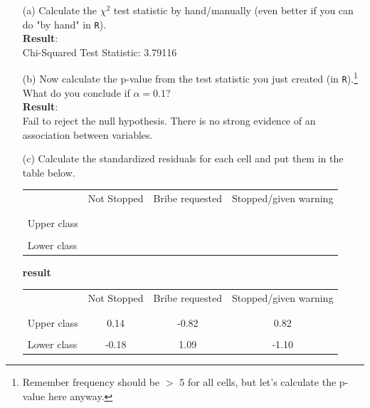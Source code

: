 \documentclass[12pt,letterpaper]{article}
\begin{document}
\begin{enumerate}
	
	\item [(a)]
	Calculate the $\chi^2$ test statistic by hand/manually (even better if you can do "by hand" in \texttt{R}).\\
			 
			 \textbf{Result}:\\
			Chi-Squared Test Statistic:  3.79116\\
			
	\vspace{7cm}
	\item [(b)]
	Now calculate the p-value from the test statistic you just created (in \texttt{R}).\footnote{Remember frequency should be $>$ 5 for all cells, but let's calculate the p-value here anyway.}  What do you conclude if $\alpha = 0.1$?\\
		 
		 \textbf{Result}:\\
		 Fail to reject the null hypothesis. There is no strong evidence of an association between variables.
	\newpage
	\item [(c)] Calculate the standardized residuals for each cell and put them in the table below.
	\vspace{1cm}
	
	\begin{table}[h]
		\centering
		\begin{tabular}{l | c c c }
			& Not Stopped & Bribe requested & Stopped/given warning \\
			\\[-1.8ex] 
			\hline \\[-1.8ex]
			Upper class  &  &  &  \\
			\\
			Lower class &  &   &   \\
			
		\end{tabular}
	\end{table}
		 
		\begin{table}[h]
			\centering
			\begin{center}
			\textbf{{\large result}}
			\end{center}
			\begin{tabular}{l | c c c }
				& Not Stopped & Bribe requested & Stopped/given warning \\
				\\[-1.8ex] 
				\hline \\[-1.8ex]
				Upper class & 0.14 & -0.82 & 0.82 \\
				\\
				Lower class & -0.18 & 1.09  & -1.10  \\
				

\end{tabular}
\end{table}
\end{enumerate}
\end{document}
